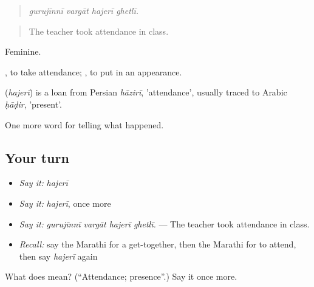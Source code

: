 \begin{quote}
\emph{gurujīnnī vargāt hajerī ghetlī.}
\end{quote}

\begin{quote}
The teacher took attendance in class.
\end{quote}

Feminine.

 , to take attendance;  , to put in an appearance.

\begin{cousinweb}
\textbf{} (\emph{hajerī}) is a loan from Persian \emph{hāzirī}, 'attendance', usually traced to Arabic \emph{ḥāḍir}, 'present'.
\end{cousinweb}

\begin{grammarlens}[title={What you've built}]
One more word for telling what happened.
\end{grammarlens}

\subsection*{Your turn}
\begin{itemize}
\raggedright
  \item \emph{Say it:} \emph{hajerī}
  \item \emph{Say it:} \emph{hajerī}, once more
  \item \emph{Say it:} \emph{gurujīnnī vargāt hajerī ghetlī.} — The teacher took attendance in class.
  \item \emph{Recall:} say the Marathi for a get-together, then the Marathi for to attend, then say \emph{hajerī} again
\end{itemize}

\begin{tcolorbox}[breakable,colback=teal!4,colframe=teal!35!black,title={Before you move on}]
What does  mean? (\textquotedblleft{}Attendance; presence\textquotedblright{}.) Say it once more.
\end{tcolorbox}
